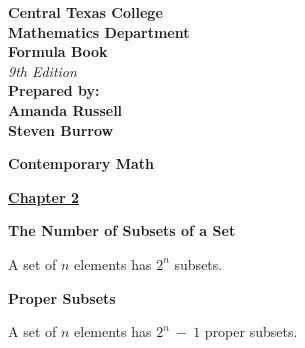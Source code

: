 \documentclass{article}
\begin{document}
\setlength{\parskip}{4mm}

\begin{large}

\newpage


\begin{center}

    
    \Huge \textbf{Central Texas College} \\[10pt]
    \Large \textbf{Mathematics Department} \\[30pt]
    
    \Huge \textbf{Formula Book} \\[15pt]
    \LARGE \textit{9th Edition} \\[40pt]
    
    \Large \textbf{Prepared by:} \\[30pt]
    \vspace{-0.5in}
    \LARGE \textbf{Amanda Russell} \\[30pt]
    \vspace{-0.5in}
    \LARGE \textbf{Steven Burrow} \\[30pt]
\end{center}


\newpage

\chead{ }

\vspace*{\fill}

\begin{center}\textbf{\Huge{ Contemporary Math }}\end{center}

\vspace*{\fill}

\newpage


\vspace{0.25in}

\underline{\textbf{\huge Chapter 2 \phantom{ } \phantom{ } \phantom{ } \phantom{ }}}

\textbf{The Number of Subsets of a Set}

\hspace{0.1in} A set of $n$ elements has $2^{n}$ subsets.

\textbf{Proper Subsets}

\hspace{0.1in} A set of $n$ elements has $2^{n}\ -\ 1$ proper subsets.

\vspace{0.25in}


\end{large}
\end{document}
